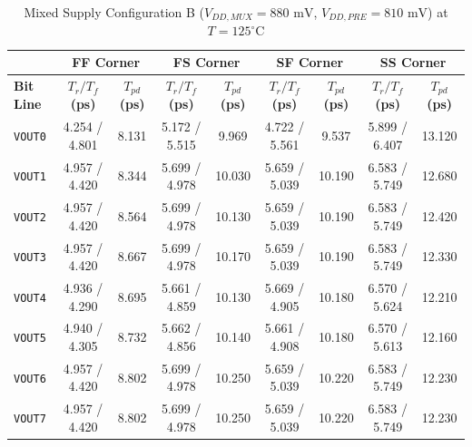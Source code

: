 \begin{table}[H]
    \centering
    \renewcommand{\arraystretch}{1.3}
    \setlength{\tabcolsep}{4pt}
    \small
    \begin{tabular}{|l|cc|cc|cc|cc|}
        \hline
        & \multicolumn{2}{c|}{\textbf{FF Corner}} & \multicolumn{2}{c|}{\textbf{FS Corner}} & \multicolumn{2}{c|}{\textbf{SF Corner}} & \multicolumn{2}{c|}{\textbf{SS Corner}} \\ \hline
        \textbf{Bit Line} & \textbf{$T_r / T_f$ (ps)} & \textbf{$T_{pd}$ (ps)} & \textbf{$T_r / T_f$ (ps)} & \textbf{$T_{pd}$ (ps)} & \textbf{$T_r / T_f$ (ps)} & \textbf{$T_{pd}$ (ps)} & \textbf{$T_r / T_f$ (ps)} & \textbf{$T_{pd}$ (ps)} \\ \hline
        \texttt{VOUT0} & 4.254 / 4.801 & 8.131 & 5.172 / 5.515 & 9.969 & 4.722 / 5.561 & 9.537 & 5.899 / 6.407 & 13.120 \\ 
        \texttt{VOUT1} & 4.957 / 4.420 & 8.344 & 5.699 / 4.978 & 10.030 & 5.659 / 5.039 & 10.190 & 6.583 / 5.749 & 12.680 \\ 
        \texttt{VOUT2} & 4.957 / 4.420 & 8.564 & 5.699 / 4.978 & 10.130 & 5.659 / 5.039 & 10.190 & 6.583 / 5.749 & 12.420 \\ 
        \texttt{VOUT3} & 4.957 / 4.420 & 8.667 & 5.699 / 4.978 & 10.170 & 5.659 / 5.039 & 10.190 & 6.583 / 5.749 & 12.330 \\ 
        \texttt{VOUT4} & 4.936 / 4.290 & 8.695 & 5.661 / 4.859 & 10.130 & 5.669 / 4.905 & 10.180 & 6.570 / 5.624 & 12.210 \\ 
        \texttt{VOUT5} & 4.940 / 4.305 & 8.732 & 5.662 / 4.856 & 10.140 & 5.661 / 4.908 & 10.180 & 6.570 / 5.613 & 12.160 \\ 
        \texttt{VOUT6} & 4.957 / 4.420 & 8.802 & 5.699 / 4.978 & 10.250 & 5.659 / 5.039 & 10.220 & 6.583 / 5.749 & 12.230 \\ 
        \texttt{VOUT7} & 4.957 / 4.420 & 8.802 & 5.699 / 4.978 & 10.250 & 5.659 / 5.039 & 10.220 & 6.583 / 5.749 & 12.230 \\ \hline
    \end{tabular}
    \vspace{2mm}
    \caption{Mixed Supply Configuration B ($V_{DD,MUX} = 880\text{ mV}$, $V_{DD,PRE} = 810\text{ mV}$) at $T = 125^{\circ}\text{C}$}
    \label{tab:asym_b_125}
\end{table}


